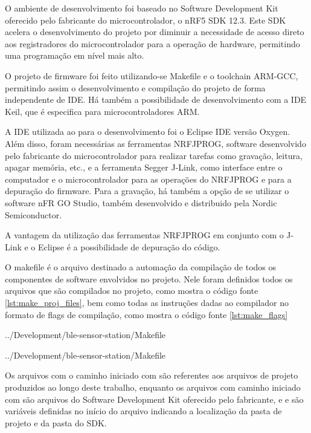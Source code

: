 O ambiente de desenvolvimento foi baseado no Software Development Kit oferecido
pelo fabricante do microcontrolador, o nRF5 SDK 12.3. Este SDK acelera o
desenvolvimento do projeto por diminuir a necessidade de acesso direto aos
registradores do microcontrolador para a operação de hardware, permitindo uma
programação em nível mais alto.
 
O projeto de firmware foi feito utilizando-se Makefile e o toolchain ARM-GCC,
permitindo assim o desenvolvimento e compilação do projeto de forma
independente de IDE. Há também a possibilidade de desenvolvimento com a IDE
Keil, que é especifica para microcontroladores ARM. 

A IDE utilizada ao para o desenvolvimento foi o Eclipse IDE versão Oxygen. Além
disso, foram necessárias as ferramentas NRFJPROG, software desenvolvido pelo
fabricante do microcontrolador para realizar tarefas como gravação, leitura,
apagar memória, etc., e a ferramenta Segger J-Link, como interface entre o
computador e o microcontrolador para as operações do NRFJPROG e para a
depuração do firmware. Para a gravação, há também a opção de se utilizar o
software nFR GO Studio, também desenvolvido e distribuido pela Nordic
Semiconductor.

A vantagem da utilização das ferramentas NRFJPROG em conjunto com o J-Link e o
Eclipse é a possibilidade de depuração do código.

O makefile é o arquivo destinado a automação da compilação de todos os
componentes de software envolvidos no projeto. Nele foram definidos todos os
arquivos que são compilados no projeto, como mostra o código fonte
\ref{lst:make_proj_files}, bem como todas as instruções dadas ao compilador no
formato de flags de compilação, como mostra o código fonte \ref{lst:make_flags}

\begin{minipage}{0.95\linewidth} 
 
{../Development/ble-sensor-station/Makefile}
\end{minipage}

\begin{minipage}{0.95\linewidth} 
 
{../Development/ble-sensor-station/Makefile}
\end{minipage}
 
Os arquivos com o caminho iniciado com  são referentes
aos arquivos de projeto produzidos ao longo deste trabalho, enquanto os arquivos
com caminho iniciado com  são arquivos do Software
Development Kit oferecido pelo fabricante, e  e
 são variáveis definidas no início do arquivo indicando a
localização da pasta de projeto e da pasta do SDK.

